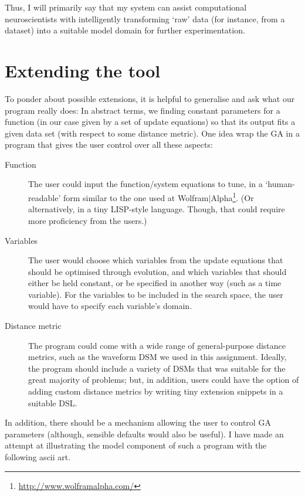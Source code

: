 \documentclass[a4paper,9pt]{article}
\newcommand{\tightit}{\vspace{-5pt}}
\begin{document}
Thus, I will primarily say that my system can assist computational
neuroscientists with intelligently transforming `raw' data (for instance, from
a dataset) into a suitable model domain for further experimentation.

\section{Extending the tool}
\tightit \label{sec:extensions}
To ponder about possible extensions, it is helpful to generalise and ask what
our program really does: In abstract terms, we finding constant parameters for
a function (in our case given by a set of update equations) so that its output
fits a given data set (with respect to some distance metric). One idea wrap the
GA in a program that gives the user control over all these aspects:
{ \footnotesize
\begin{description}
    \item[Function] The user could input the function/system equations to
        tune, in a `human-readable' form similar to the one used at
        Wolfram$|$Alpha\footnote{\url{http://www.wolframalpha.com/}}. (Or
        alternatively, in a tiny LISP-style language. Though, that could
        require more proficiency from the users.) 
    \item[Variables] The user would choose which variables from the update
        equations that should be optimised through evolution, and which
        variables that should either be held constant, or be specified in
        another way (such as a time variable). For the variables to be
        included in the search space, the user would have to specify each
        variable's domain.
    \item[Distance metric] The program could come with a wide range of
        general-purpose distance metrics, such as the waveform DSM we used in
        this assignment. Ideally, the program should include a variety of DSMs
        that was suitable for the great majority of problems; but, in
        addition, users could have the option of adding custom distance
        metrics by writing tiny extension snippets in a suitable DSL.
\end{description}
}
In addition, there should be a mechanism allowing the user to control GA
parameters (although, sensible defaults would also be useful).  I have made an
attempt at illustrating the model component of such a program with the
following ascii art.
\end{document}
